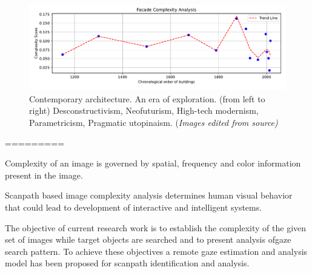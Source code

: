      \begin{figure}[htb]
          \centering
          \includegraphics[width= \linewidth]{Graphs/complexitygraph}
          \caption{Contemporary architecture. An era of exploration. (from left to right) Desconstructivism, Neofuturism, High-tech modernism, Parametricism, Pragmatic utopinaism.  (\textit{Images edited from source)}}
          \label{fig:complexitygraph}
        \end{figure}


=========

 Complexity of an image is governed by spatial, frequency and color information present in the image.\cite{Ishrat2020}

Scanpath based image complexity analysis determines human visual behavior that could lead to development of interactive and intelligent systems.\cite{Ishrat2020}

The objective of current research work is to establish the complexity of the given set of images while target objects are searched and to present analysis ofgaze search pattern.
To achieve these objectives a remote gaze estimation and analysis model has been proposed for scanpath identification and analysis.\cite{Ishrat2020}




